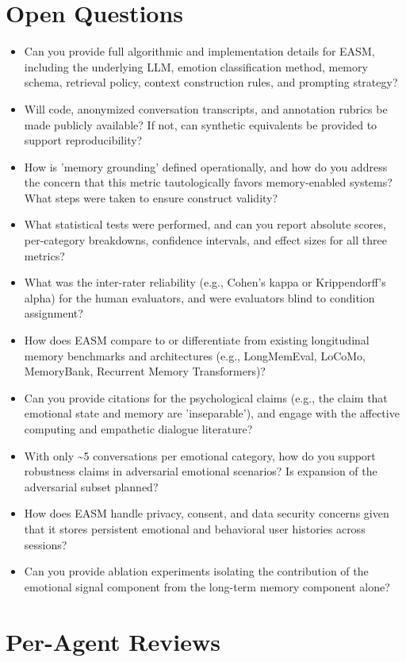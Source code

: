 \documentclass[11pt]{article}
\begin{document}
\section*{Open Questions}
\begin{itemize}[leftmargin=*]
  \item Can you provide full algorithmic and implementation details for EASM, including the underlying LLM, emotion classification method, memory schema, retrieval policy, context construction rules, and prompting strategy?
  \item Will code, anonymized conversation transcripts, and annotation rubrics be made publicly available? If not, can synthetic equivalents be provided to support reproducibility?
  \item How is 'memory grounding' defined operationally, and how do you address the concern that this metric tautologically favors memory-enabled systems? What steps were taken to ensure construct validity?
  \item What statistical tests were performed, and can you report absolute scores, per-category breakdowns, confidence intervals, and effect sizes for all three metrics?
  \item What was the inter-rater reliability (e.g., Cohen's kappa or Krippendorff's alpha) for the human evaluators, and were evaluators blind to condition assignment?
  \item How does EASM compare to or differentiate from existing longitudinal memory benchmarks and architectures (e.g., LongMemEval, LoCoMo, MemoryBank, Recurrent Memory Transformers)?
  \item Can you provide citations for the psychological claims (e.g., the claim that emotional state and memory are 'inseparable'), and engage with the affective computing and empathetic dialogue literature?
  \item With only \~{}5 conversations per emotional category, how do you support robustness claims in adversarial emotional scenarios? Is expansion of the adversarial subset planned?
  \item How does EASM handle privacy, consent, and data security concerns given that it stores persistent emotional and behavioral user histories across sessions?
  \item Can you provide ablation experiments isolating the contribution of the emotional signal component from the long-term memory component alone?
\end{itemize}

\section*{Per-Agent Reviews}
\end{document}
